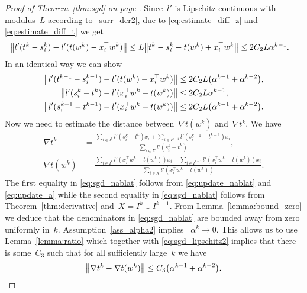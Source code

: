 \begin{proof}[Proof of Theorem~\ref{thm:sgd} on page \pageref{thm:sgd}]
  Since~$l'$ is Lipschitz continuous with modulus~$L$ according to~\ref{surr_der2}, due to \eqref{eq:estimate_diff_z} and \eqref{eq:estimate_diff_t} we get
  \begin{equation}\label{eq:sgd_lipschitz1}
    \begin{aligned}
      \nrm{l'(t^k-s_i^k) - l'(t(w^k)-x_i^\top w^k)}
      & \le L \nrm{t^k-s_i^k - t(w^k)+ x_i^\top w^k}
        \le  2C_2L\alpha^{k-1}.
    \end{aligned}
  \end{equation}
  In an identical way we can show
  \begin{equation}\label{eq:sgd_lipschitz2}
    \begin{aligned}
      \nrm{l'(t^{k-1}-s_i^{k-1}) - l'(t(w^k)-x_i^\top w^k)}
      & \le 2C_2L\Brac{\alpha^{k-1}+\alpha^{k-2}}, \\
      \nrm{l'(s_i^k-t^k) - l'(x_i^\top w^k-t(w^k))}
      & \le 2C_2L\alpha^{k-1}, \\
      \nrm{l'(s_i^{k-1}-t^{k-1}) - l'(x_i^\top w^k-t(w^k))}
      & \le 2C_2L\Brac{\alpha^{k-1}+\alpha^{k-2}}.
    \end{aligned}
  \end{equation}
  Now we need to estimate the distance between~$\nabla t(w^k)$ and~$\nabla t^k$. We have
  \begin{equation}\label{eq:sgd_nablat}
    \begin{aligned}
      \nabla t^k
      & = \frac{\sum_{i\in I^k}l'(s_i^k-t^k)x_i + \sum_{i\in I^{k-1}}l'(s_i^{k-1}-t^{k-1})x_i}{\sum_{i\in X}l'(s_i^k-t^k)}, \\
      \nabla t(w^k)
      & = \frac{\sum_{i\in I^k}l'(x_i^\top w^k-t(w^k))x_i + \sum_{i\in I^{k-1}}l'(x_i^\top w^k-t(w^k))x_i}{\sum_{i\in X}l'(x_i^\top w^k-t(w^k))}.
    \end{aligned}
  \end{equation}
  The first equality in \eqref{eq:sgd_nablat} follows from \eqref{eq:update_nablat} and \eqref{eq:update_a} while the second equality in \eqref{eq:sgd_nablat} follows from Theorem~\ref{thm:derivative} and~$X=I^k\cup I^{k-1}$. From Lemma~\ref{lemma:bound_zero} we deduce that the denominators in \eqref{eq:sgd_nablat} are bounded away from zero uniformly in~$k$. Assumption~\ref{ass_alpha2} implies ~$\alpha^k\to 0$. This allows us to use Lemma~\ref{lemma:ratio} which together with \eqref{eq:sgd_lipschitz2} implies that there is some~$C_3$ such that for all sufficiently large~$k$ we have
  \begin{equation}\label{eq:sgd_nablat_diff}
    \norm{\nabla t^k - \nabla t(w^k)} \le C_3\Brac{\alpha^{k-1} + \alpha^{k-2}}.
  \end{equation}


\end{proof}
